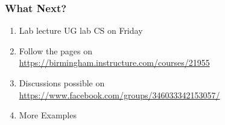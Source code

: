 \documentclass{beamer}
\def\mcolor#1#2{\rule{0ex}{0ex}\color{#1}#2\color{black}{}}
\begin{document}
\begin{frame}
\frametitle{What Next?}

\begin{enumerate}
 \item \mcolor{red}{Lab lecture} UG lab CS on Friday
  \item Follow the pages on\\ 
        \url{https://birmingham.instructure.com/courses/21955}

  \item Discussions possible on\\
        \url{https://www.facebook.com/groups/346033342153057/}

  \item \mcolor{blue}{More Examples}
\end{enumerate}
\end{frame}
\end{document}
